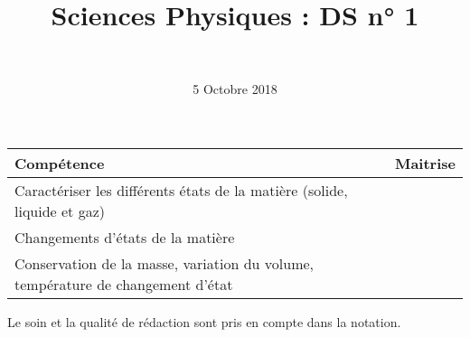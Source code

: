 \documentclass[a4paper,11pt]{exam}
\author{\ }
\date{5 Octobre 2018}
\title{Sciences Physiques : DS n° 1}
\begin{document}
%	

	\maketitle
	
\begin{small}
	\begin{center}
		\begin{tabular}{|@{\ }l@{}|@{\ }c@{\ }|}
			\hline
			\textbf{Compétence} & \textbf{Maitrise} \\
			\hline
			Caractériser les différents états de la matière (solide, liquide et gaz)\ &  \ \ \ \\
			\hline	
			Changements d’états de la matière \ &  \ \ \ \\
			\hline
			Conservation de la masse, variation du volume, température de changement d’état \ &  \ \ \ \\
			\hline
		\end{tabular}
	\end{center}
\end{small}	
	
	

%

%

Le soin et la qualité de rédaction sont pris en compte dans la notation.









%






\newpage




%


%

%

%


 

%
\ \label{LastPage}
\end{document}
